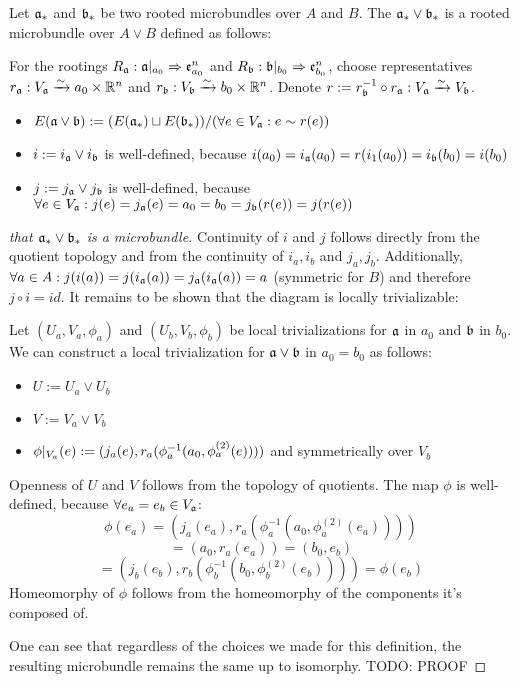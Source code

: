 \begin{mydefinition}
    Let $\mathfrak{a}_*$ and $\mathfrak{b}_*$ be two rooted microbundles over $A$ and $B$.
    The  $\mathfrak{a}_* \vee \mathfrak{b}_*$ is a rooted microbundle over $A \vee B$ defined as follows:

    For the rootings $R_{\mathfrak{a}}: \mathfrak{a}\vert_{a_0} \Rightarrow \mathfrak{e}^n_{a_0}$ and $R_{\mathfrak{b}}: \mathfrak{b}\vert_{b_0} \Rightarrow \mathfrak{e}^n_{b_0}$,
    choose representatives $r_{\mathfrak{a}}: V_{\mathfrak{a}} \xrightarrow{\sim} a_0 \times \mathbb{R}^n$ and $r_{\mathfrak{b}}: V_{\mathfrak{b}} \xrightarrow{\sim} b_0 \times \mathbb{R}^n$.
    Denote $r := r_{\mathfrak{b}}^{-1} \circ r_{\mathfrak{a}}: V_{\mathfrak{a}} \xrightarrow{\sim} V_{\mathfrak{b}}$.
    \begin{itemize}
        \item $E(\mathfrak{a} \vee \mathfrak{b}) := (E(\mathfrak{a}_*) \sqcup E(\mathfrak{b}_*)) / (\forall e \in V_{\mathfrak{a}}: e \sim r(e))$
        \item $i := i_{\mathfrak{a}} \vee i_{\mathfrak{b}}$ is well-defined, because $i(a_0) = i_{\mathfrak{a}}(a_0) = r(i_1(a_0)) = i_{\mathfrak{b}}(b_0) = i(b_0)$
        \item $j := j_{\mathfrak{a}} \vee j_{\mathfrak{b}}$ is well-defined, because $\forall e \in V_{\mathfrak{a}}: j(e) = j_{\mathfrak{a}}(e) = a_0 = b_0 = j_{\mathfrak{b}}(r(e)) = j(r(e))$
    \end{itemize}
\end{mydefinition}
\begin{proof}[that $\mathfrak{a}_* \vee \mathfrak{b}_*$ is a microbundle]
    Continuity of $i$ and $j$ follows directly from the quotient topology and from the continuity of $i_a, i_b$ and $j_a, j_b$.
    Additionally, $\forall a \in A: j(i(a)) = j(i_{\mathfrak{a}}(a)) = j_{\mathfrak{a}}(i_{\mathfrak{a}}(a)) = a$ (symmetric for $B$) and therefore $j \circ i = id$.
    It remains to be shown that the diagram is locally trivializable:

    Let $(U_a, V_a, \phi_a)$ and $(U_b, V_b, \phi_b)$ be local trivializations for $\mathfrak{a}$ in $a_0$ and $\mathfrak{b}$ in $b_0$.
    We can construct a local trivialization for $\mathfrak{a} \vee \mathfrak{b}$ in $a_0 = b_0$ as follows:
    \begin{itemize}
        \item $U := U_a \vee U_b$
        \item $V := V_a \vee V_b$
        \item $\phi\vert_{V_a}(e) := (j_a(e), r_a(\phi_a^{-1}(a_0, \phi_a^{(2)}(e))))$ and symmetrically over $V_b$
    \end{itemize}
    Openness of $U$ and $V$ follows from the topology of quotients.
    The map $\phi$ is well-defined, because $\forall e_a = e_b \in V_{\mathfrak{a}}$:
    \[ \phi(e_a) = (j_a(e_a), r_a(\phi_a^{-1}(a_0, \phi_a^{(2)}(e_a)))) \]
    \[ = (a_0, r_a(e_a)) = (b_0, e_b) \]
    \[ = (j_b(e_b), r_b(\phi_b^{-1}(b_0, \phi_b^{(2)}(e_b)))) = \phi(e_b) \]
    Homeomorphy of $\phi$ follows from the homeomorphy of the components it's composed of.

    One can see that regardless of the choices we made for this definition, the resulting microbundle remains the same up to isomorphy.
    TODO: PROOF
\end{proof}

